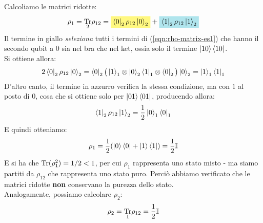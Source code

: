 \documentclass[../../InformazioneQuantistica.tex]{subfiles}
\begin{document}
Calcoliamo le matrici ridotte:
\begin{align*}
\rho_1 = \underset{2}{\op{Tr}} \rho_{12} = \hlc{Yellow}{\bra{0}_2 \rho_{12} \ket{0}_2} +\hlc{SkyBlue}{ \bra{1}_2 \rho_{12} \ket{1}_2}
\end{align*}
Il termine in giallo \textit{seleziona} tutti i termini di (\ref{eqn:rho-matrix-es1}) che hanno il secondo qubit a $0$ sia nel bra che nel ket, ossia solo il termine $\Ket{10}\Bra{10}$.\\
Si ottiene allora:
\begin{align*}
2\Bra{0}_2 \rho_{12}\Ket{0}_2 = \Bra{0}_2 \big(\Ket{1}_1 \otimes \Ket{0}_2 \Bra{1}_1 \otimes \Bra{0}_2\big) \Ket{0}_2 = \Ket{1}_1\Bra{1}_1
\end{align*}
 D'altro canto, il termine in azzurro verifica la stessa condizione, ma con $1$ al posto di $0$, cosa che si ottiene solo per $\Ket{01}\Bra{01} $, producendo allora:
\begin{align*}
\Bra{1}_2 \rho_{12}\Ket{1}_2 =\frac{1}{2}\Ket{0}_1\Bra{0}_1
\end{align*}
E quindi otteniamo:
\begin{align*}
\rho_1 = \frac{1}{2}(\Ket{0}\Bra{0} + \Ket{1}\Bra{1}) = \frac{1}{2}\mathbb{I}
\end{align*}
E si ha che $\operatorname{Tr}(\rho_1^2) = 1/2 < 1$, per cui $\rho_1$ rappresenta uno stato misto - ma siamo partiti da $\rho_{12}$ che rappresenta uno stato puro. Perciò abbiamo verificato che le matrici ridotte \textbf{non} conservano la purezza dello stato.\\

Analogamente, possiamo calcolare $\rho_2$:
\begin{align*}
\rho_2 = \underset{1}{\operatorname{Tr}}\rho_{12}= \frac{1}{2}\mathbb{I}
\end{align*}
\end{document}
